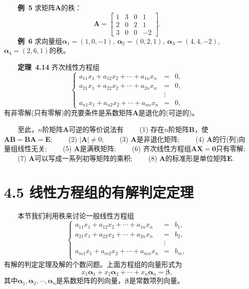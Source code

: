 \documentclass[compress,mathserif,cjk]{beamer}
\theoremstyle{remark}
\numberwithin{equation}{section}
\newcommand{\hei}{\bf}      %
\begin{document}
\begin{CJK}{UTF8}{gbsn}
\begin{frame}
 \ \ \ \ {\hei 例~5} 求矩阵$\bm A$的秩：
 $$\bm A=\left[\begin{matrix}1&3&0&1\\2&0&2&1\\3&0&0&-2\end{matrix}\right].$$
 \pause\vskip 10pt
 \ \ \ \ {\hei 例~6} 求向量组$\bm\alpha_1=(1,0,-1),~\bm\alpha_2=(0,2,1),~\bm\alpha_3=(4,4,-2),$ $\bm\alpha_4=(2,6,1)$的秩。
\end{frame}
\begin{frame}
 \ \ \ \ {\hei 定理~4.14} 齐次线性方程组
 \begin{equation*}
 \left\{\begin{array}{rcl}
 a_{11}x_1+a_{12}x_2+\cdots+a_{1n}x_n&=&0,\\
 a_{21}x_1+a_{22}x_2+\cdots+a_{2n}x_n&=&0,\\
 &\vdots&\\
 a_{n1}x_1+a_{n2}x_2+\cdots+a_{nn}x_n&=&0,
 \end{array}\right.
 \end{equation*}
 有非零解(只有零解)的充要条件是系数矩阵$\bm A$是退化的(可逆的)。
 \end{frame}
\begin{frame}
 \ \ \ \ 至此，$n$阶矩阵$\bm A$可逆的等价说法有
 \vskip 5pt
 \ \ \ \ (1) 存在$n$阶矩阵$\bm B$，使$\bm{AB}=\bm{BA}=\bm E$;
 \vskip 5pt
 \ \ \ \ (2) $|\bm A|\neq0$;
 \vskip 5pt
 \ \ \ \ (3) $\bm A$是非退化矩阵;
 \vskip 5pt
 \ \ \ \ (4) $\bm A$的行(列)向量组线性无关;
 \vskip 5pt
 \ \ \ \ (5) $\bm A$是满秩矩阵;
 \vskip 5pt
 \ \ \ \ (6) 齐次线性方程组$\bm{AX}=\bm 0$只有零解;
 \vskip 5pt
 \ \ \ \ (7) $\bm A$可以写成一系列初等矩阵的乘积;
  \vskip 5pt
 \ \ \ \ (8) $\bm A$的标准形是单位矩阵$\bm E$.
\end{frame}
\setcounter{section}{7}
\section[4.5]{4.5 线性方程组的有解判定定理}

\begin{frame}
 \ \ \ \ 本节我们利用秩来讨论一般线性方程组
 \begin{equation*}
 \left\{\begin{array}{rcl}
 a_{11}x_1+a_{12}x_2+\cdots+a_{1n}x_n&=&b_1,\\
 a_{21}x_1+a_{22}x_2+\cdots+a_{2n}x_n&=&b_2,\\
 &\vdots&\\
 a_{m1}x_1+a_{m2}x_2+\cdots+a_{mn}x_n&=&b_m,\\
 \end{array}\right.
 \end{equation*}
 有解的判定定理及解的个数问题。上面方程组的向量形式为
 $$x_1\bm\alpha_1+x_2\bm\alpha_2+\cdots +x_n\bm\alpha_n=\bm\beta,$$
 其中$\bm\alpha_1,\bm\alpha_2,\cdots,\bm\alpha_n$是系数矩阵的列向量，$\bm\beta$是常数项列向量。
\end{frame}


\end{CJK}
\end{document}

